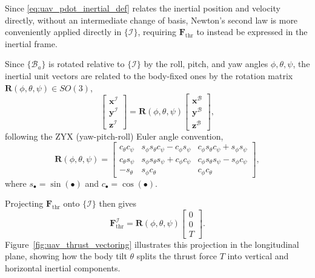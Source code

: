Since \eqref{eq:uav_pdot_inertial_def} relates the inertial position and velocity directly, without an intermediate change of basis, Newton's second law is more conveniently applied directly in $\{\mathcal{I}\}$, requiring $\mathbf{F}_{\mathrm{thr}}$ to instead be expressed in the inertial frame. 

Since $\{\mathcal{B}_a\}$ is rotated relative to $\{\mathcal{I}\}$ by the roll, pitch, and yaw angles $\phi, \theta, \psi$, the inertial unit vectors are related to the body-fixed ones by the rotation matrix $\mathbf{R}(\phi,\theta,\psi) \in SO(3)$,
\begin{equation}
    \begin{bmatrix} \mathbf{x}^{\mathcal{I}} \\ \mathbf{y}^{\mathcal{I}} \\ \mathbf{z}^{\mathcal{I}} \end{bmatrix} = \mathbf{R}(\phi,\theta,\psi) \begin{bmatrix} \mathbf{x}^{\mathcal{B}} \\ \mathbf{y}^{\mathcal{B}} \\ \mathbf{z}^{\mathcal{B}} \end{bmatrix},
    \label{eq:uav_basis_change}
\end{equation}
following the ZYX (yaw-pitch-roll) Euler angle convention,
\begin{equation}
    \mathbf{R}(\phi,\theta,\psi) =
    \begin{bmatrix}
        c_\theta c_\psi & s_\phi s_\theta c_\psi - c_\phi s_\psi & c_\phi s_\theta c_\psi + s_\phi s_\psi \\
        c_\theta s_\psi & s_\phi s_\theta s_\psi + c_\phi c_\psi & c_\phi s_\theta s_\psi - s_\phi c_\psi \\
        -s_\theta & s_\phi c_\theta & c_\phi c_\theta
    \end{bmatrix},
    \label{eq:uav_rotation_matrix}
\end{equation}
where $s_\bullet = \sin(\bullet)$ and $c_\bullet = \cos(\bullet)$. 

Projecting $\mathbf{F}_{\mathrm{thr}}$ onto $\{\mathcal{I}\}$ then gives
\begin{equation}
    \mathbf{F}_{\mathrm{thr}}^{\mathcal{I}} = \mathbf{R}(\phi,\theta,\psi)\begin{bmatrix} 0 \\ 0 \\ T \end{bmatrix}.
    \label{eq:uav_thrust_inertial}
\end{equation}
Figure~\ref{fig:uav_thrust_vectoring} illustrates this projection in the longitudinal plane, showing how the body tilt $\theta$ splits the thrust force $T$ into vertical and horizontal inertial components.

